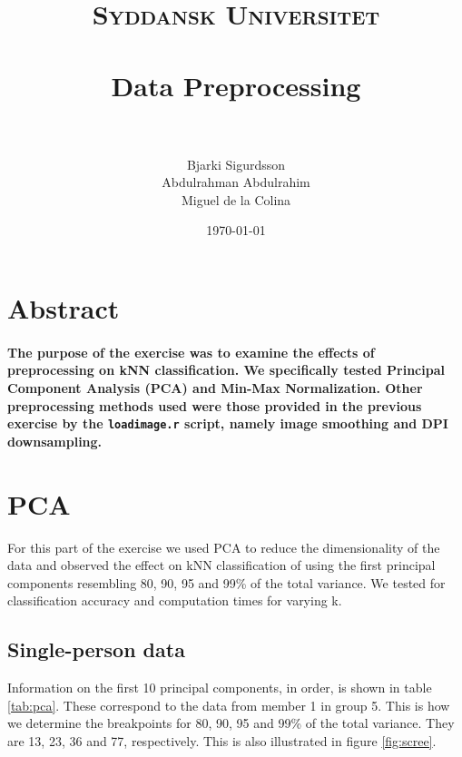\documentclass[paper=a4, fontsize=11pt]{scrartcl} %
\title{	
\normalfont \normalsize 
\textsc{Syddansk Universitet} \\ [25pt] 
\horrule{0.5pt} \\[0.4cm] %
\huge Data Preprocessing \\ %
\horrule{2pt} \\[0.5cm] %
}
\author{Bjarki Sigurdsson \\ Abdulrahman Abdulrahim \\ Miguel de la Colina}
\date{\normalsize\today} %
\begin{document}
\maketitle %



\section*{Abstract}

\paragraph{The purpose of the exercise was to examine the effects of preprocessing on kNN classification. We specifically tested Principal Component Analysis (PCA) and Min-Max Normalization. Other preprocessing methods used were those provided in the previous exercise by the \texttt{loadimage.r} script, namely image smoothing and DPI downsampling.}




\section{PCA}
For this part of the exercise we used PCA to reduce the dimensionality of the data and observed the effect on kNN classification of using the first principal components resembling 80, 90, 95 and 99\% of the total variance. We tested for classification accuracy and computation times for varying k.\par%
\subsection{Single-person data}
Information on the first 10 principal components, in order, is shown in table \ref{tab:pca}. These correspond to the data from member 1 in group 5. This is how we determine the breakpoints for 80, 90, 95 and 99\% of the total variance. They are 13, 23, 36 and 77, respectively. This is also illustrated in figure \ref{fig:scree}. \par
\end{document}

